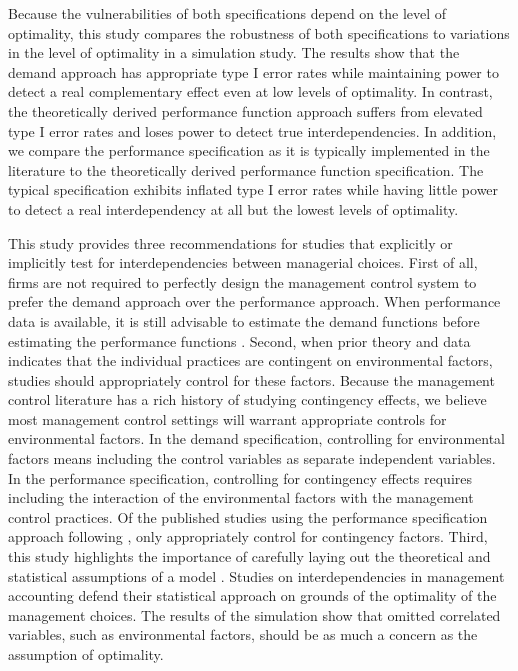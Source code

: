 \documentclass[12pt]{article}
\begin{document}
Because the vulnerabilities of both specifications depend on the level of optimality, this study compares the robustness of both specifications to variations in the level of optimality in a simulation study. The results show that the demand approach has appropriate type I error rates while maintaining power to detect a real complementary effect even at low levels of optimality. In contrast, the theoretically derived performance function approach suffers from elevated type I error rates and loses power to detect true interdependencies. In addition, we compare the performance specification as it is typically implemented in the literature to the theoretically derived performance function specification. The typical specification exhibits inflated type I error rates while having little power to detect a real interdependency at all but the lowest levels of optimality.

This study provides three recommendations for studies that explicitly or implicitly test for interdependencies between managerial choices. First of all, firms are not required to perfectly design the management control system to prefer the demand approach over the performance approach. When performance data is available, it is still advisable to estimate the demand functions before estimating the performance functions \citep{Aral2012, Cassiman2006}. Second, when prior theory and data indicates that the individual practices are contingent on environmental factors, studies should appropriately control for these factors. Because the management control literature has a rich history of studying contingency effects, we believe most management control settings will warrant appropriate controls for environmental factors. In the demand specification, controlling for environmental factors means including the control variables as separate independent variables. In the performance specification, controlling for contingency effects requires including the interaction of the environmental factors with the management control practices. Of the published studies using the performance specification approach following \citet{Grabner2013}, only \citet{Bedford2016,Bedford2018PerformanceFirms} appropriately control for contingency factors. Third, this study highlights the importance of carefully laying out the theoretical and statistical assumptions of a model \citep{Chenhall2007}. Studies on interdependencies in management accounting defend their statistical approach on grounds of the optimality of the management choices. The results of the simulation show that omitted correlated variables, such as environmental factors, should be as much a concern as the assumption of optimality.
\end{document}
